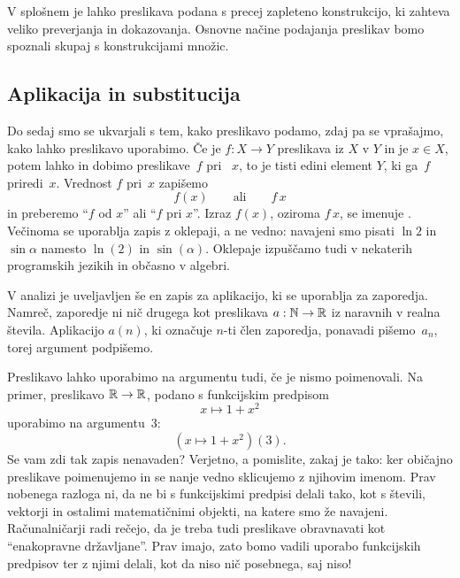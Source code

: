 V splošnem je lahko preslikava podana s precej zapleteno konstrukcijo, ki zahteva veliko
preverjanja in dokazovanja. Osnovne načine podajanja preslikav bomo spoznali skupaj s
konstrukcijami množic.


\subsection{Aplikacija in substitucija}
\label{sec:aplikacija-in-subsitucija}

Do sedaj smo se ukvarjali s tem, kako preslikavo podamo, zdaj pa se vprašajmo, kako lahko
preslikavo uporabimo. Če je $f : X \to Y$ preslikava iz $X$ v $Y$ in je $x \in X$, potem
lahko  in dobimo  preslikave~$f$ pri
~$x$, to je tisti edini element $Y$, ki ga~$f$ priredi~$x$. Vrednost $f$
pri~$x$ zapišemo
%
\begin{equation*}
  f(x)
  \qquad\text{ali}\qquad
  f\,x
\end{equation*}
%
in preberemo ``$f$ od $x$'' ali ``$f$ pri $x$''. Izraz $f(x)$, oziroma $f\,x$, se imenuje
. Večinoma se uporablja zapis z oklepaji, a ne vedno: navajeni smo pisati
$\ln 2$ in $\sin \alpha$ namesto $\ln(2)$ in $\sin(\alpha)$. Oklepaje izpuščamo tudi v
nekaterih programskih jezikih in občasno v algebri.

V analizi je uveljavljen še en zapis za aplikacijo, ki se uporablja za zaporedja. Namreč,
zaporedje ni nič drugega kot preslikava $a : \mathbb{N} \to \mathbb{R}$ iz naravnih v realna števila.
Aplikacijo $a(n)$, ki označuje $n$-ti člen zaporedja, ponavadi pišemo~$a_n$, torej
argument podpišemo.

Preslikavo lahko uporabimo na argumentu tudi, če je nismo poimenovali. Na primer,
preslikavo $\mathbb{R} \to \mathbb{R}$, podano s funkcijskim predpisom
%
\begin{equation*}
  x \mapsto 1 + x^2
\end{equation*}
%
uporabimo na argumentu~$3$:
%
\begin{equation*}
  (x \mapsto 1 + x^2)(3).
\end{equation*}
%
Se vam zdi tak zapis nenavaden? Verjetno, a pomislite, zakaj je tako: ker običajno
preslikave poimenujemo in se nanje vedno sklicujemo z njihovim imenom. Prav nobenega
razloga ni, da ne bi s funkcijskimi predpisi delali tako, kot s števili, vektorji in
ostalimi matematičnimi objekti, na katere smo že navajeni. Računalničarji radi rečejo, da
je treba tudi preslikave obravnavati kot ``enakopravne državljane''. Prav imajo, zato
bomo vadili uporabo funkcijskih predpisov ter z njimi delali, kot da niso nič posebnega,
saj niso!

